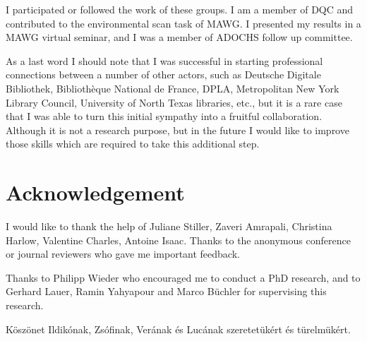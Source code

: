 I participated or followed the work of these groups. I am a member of DQC and contributed to the environmental scan task of MAWG. I presented my results in a MAWG virtual seminar, and I was a member of ADOCHS follow up committee.

As a last word I should note that I was successful in starting professional connections between a number of other actors, such as Deutsche Digitale Bibliothek, Bibliothèque National de France, DPLA, Metropolitan New York Library Council, University of North Texas libraries, etc., but it is a rare case that I was able to turn this initial sympathy into a fruitful collaboration. Although it is not a research purpose, but in the future I would like to improve those skills which are required to take this additional step.

\section{Acknowledgement}

I would like to thank the help of Juliane Stiller, Zaveri Amrapali, Christina Harlow, Valentine Charles, Antoine Isaac. Thanks to the anonymous conference or journal reviewers who gave me important feedback.

Thanks to Philipp Wieder who encouraged me to conduct a PhD research, and to Gerhard Lauer, Ramin Yahyapour and Marco Büchler for supervising this research.

Köszönet Ildikónak, Zsófinak, Verának és Lucának szeretetükért és türelmükért.